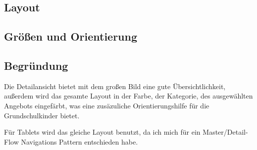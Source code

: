 \documentclass[11pt, oneside]{article}
\begin{document}
\subsection{Layout}

\subsection{Größen und Orientierung}

\subsection{Begründung}
Die Detailansicht bietet mit dem großen Bild eine gute Übersichtlichkeit, außerdem wird das gesamte Layout in der Farbe, der Kategorie, des ausgewählten Angebots eingefärbt, was eine zusäzuliche Orientierungshilfe für die Grundschulkinder bietet.

Für Tablets wird das gleiche Layout benutzt, da ich mich für ein Master/Detail-Flow Navigations Pattern entschieden habe.
\end{document}
